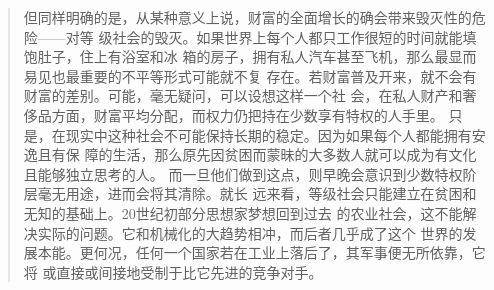 \begin{paracol}{2}
\switchcolumn

\begin{quotation}
但同样明确的是，从某种意义上说，财富的全面增长的确会带来毁灭性的危险——对等
级社会的毁灭。如果世界上每个人都只工作很短的时间就能填饱肚子，住上有浴室和冰
箱的房子，拥有私人汽车甚至飞机，那么最显而易见也最重要的不平等形式可能就不复
存在。若财富普及开来，就不会有财富的差别。可能，毫无疑问，可以设想这样一个社
会，在私人财产和奢侈品方面，财富平均分配，而权力仍把持在少数享有特权的人手里。
只是，在现实中这种社会不可能保持长期的稳定。因为如果每个人都能拥有安逸且有保
障的生活，那么原先因贫困而蒙昧的大多数人就可以成为有文化且能够独立思考的人。
而一旦他们做到这点，则早晚会意识到少数特权阶层毫无用途，进而会将其清除。就长
远来看，等级社会只能建立在贫困和无知的基础上。20世纪初部分思想家梦想回到过去
的农业社会，这不能解决实际的问题。它和机械化的大趋势相冲，而后者几乎成了这个
世界的发展本能。更何况，任何一个国家若在工业上落后了，其军事便无所依靠，它将
或直接或间接地受制于比它先进的竞争对手。
\end{quotation}

\switchcolumn*


\end{paracol}
